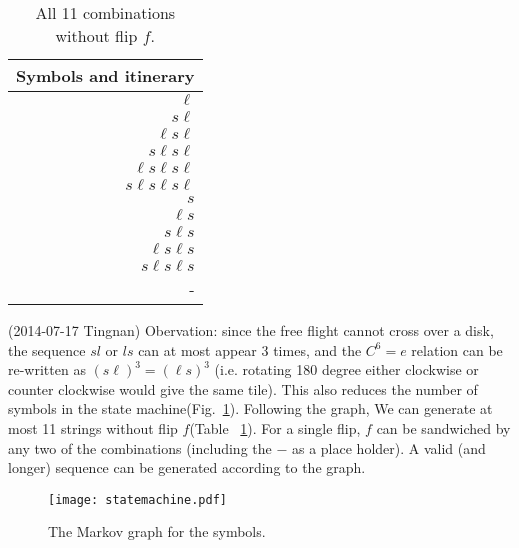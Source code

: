 \begin{table}
\begin{center}
\begin{tabular}{r}
Symbols and itinerary \\\hline
$\ell$  \\
$s\ell$ \\
$\ell s \ell$ \\
$s \ell s \ell$ \\
$\ell s \ell s \ell$ \\
$s\ell s \ell s \ell$ \\
$s$  \\
$\ell s$ \\
$s \ell s $ \\
$\ell s \ell s$ \\
$s \ell s \ell s$ \\
- \\\hline
\end{tabular}
\end{center}
\caption{All 11 combinations without flip $f$. }
\label{tab:11slcombos}
\end{table}
(2014-07-17 Tingnan) Obervation: since the free flight cannot cross over a disk, the sequence $sl$ or $ls$ can at most appear 3 times, and the $C^6=e$ relation can be re-written as $(s\ell)^3=(\ell s)^3$ (i.e. rotating 180 degree either clockwise or counter clockwise would give the same tile). This also reduces the number of symbols in the state machine(Fig.~\ref{fig:statemachine}). Following the graph, We can generate at most 11 strings without flip $f$(Table ~\ref{tab:11slcombos}). For a single flip, $f$ can be sandwiched by 
any two of the combinations (including the $-$ as a place holder). A valid (and longer) sequence can be generated according to the graph.
\begin{figure}
\texttt{[image: statemachine.pdf]}
\caption{\label{fig:statemachine} The Markov graph for the symbols.
}
\end{figure}
